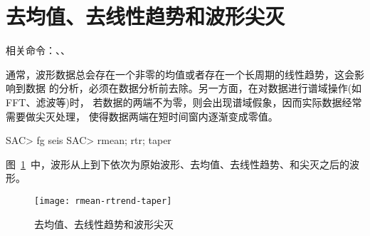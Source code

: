 \section{去均值、去线性趋势和波形尖灭}
相关命令：、、

通常，波形数据总会存在一个非零的均值或者存在一个长周期的线性趋势，这会影响到数据
的分析，必须在数据分析前去除。另一方面，在对数据进行谱域操作(如FFT、滤波等)时，
若数据的两端不为零，则会出现谱域假象，因而实际数据经常需要做尖灭处理，
使得数据两端在短时间窗内逐渐变成零值。

\begin{SACCode}
SAC> fg seis
SAC> rmean; rtr; taper
\end{SACCode}

图~\ref{fig:rmean-rtrend-taper}~中，波形从上到下依次为原始波形、去均值、去线性趋势、和尖灭之后的波形。

\begin{figure}[H]
\centering
\texttt{[image: rmean-rtrend-taper]}
\caption{去均值、去线性趋势和波形尖灭}
\label{fig:rmean-rtrend-taper}
\end{figure}
